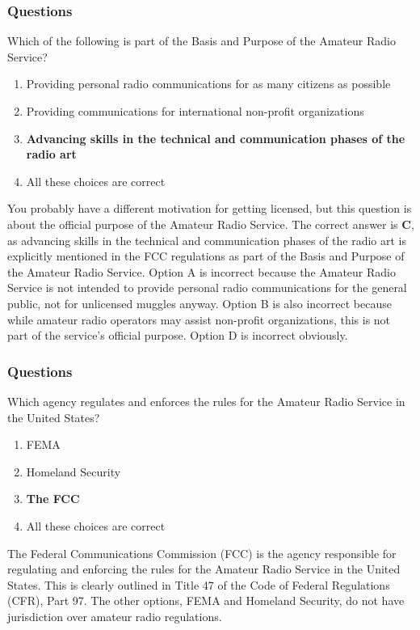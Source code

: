 \subsubsection{Questions}
\begin{tcolorbox}[colback=gray!10!white,colframe=black!75!black,title={T1A01}]
    Which of the following is part of the Basis and Purpose of the Amateur Radio Service?
    \begin{enumerate}[label=\Alph*),noitemsep]
        \item Providing personal radio communications for as many citizens as possible
        \item Providing communications for international non-profit organizations
        \item \textbf{Advancing skills in the technical and communication phases of the radio art}
        \item All these choices are correct
    \end{enumerate}
\end{tcolorbox}

You probably have a different motivation for getting licensed, but this question is about the official purpose of the Amateur Radio Service.
The correct answer is \textbf{C}, as advancing skills in the technical and communication phases of the radio art is explicitly mentioned in the FCC regulations as part of the Basis and Purpose of the Amateur Radio Service. Option A is incorrect because the Amateur Radio Service is not intended to provide personal radio communications for the general public, not for unlicensed muggles anyway. Option B is also incorrect because while amateur radio operators may assist non-profit organizations, this is not part of the service's official purpose. Option D is incorrect obviously.



\subsubsection{Questions}

\begin{tcolorbox}[colback=gray!10!white,colframe=black!75!black,title={T1A02}]
    Which agency regulates and enforces the rules for the Amateur Radio Service in the United States?
    \begin{enumerate}[label=\Alph*),noitemsep]
        \item FEMA
        \item Homeland Security
        \item \textbf{The FCC}
        \item All these choices are correct
    \end{enumerate}
\end{tcolorbox}

The Federal Communications Commission (FCC) is the agency responsible for regulating and enforcing the rules for the Amateur Radio Service in the United States. This is clearly outlined in Title 47 of the Code of Federal Regulations (CFR), Part 97. The other options, FEMA and Homeland Security, do not have jurisdiction over amateur radio regulations. 
